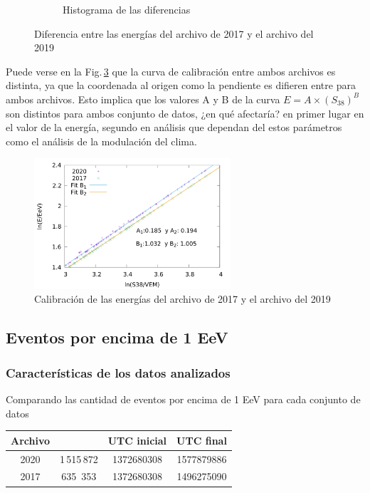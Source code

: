 \begin{figure}[H]
\begin{subfigure}[b]{0.5\textwidth}
							\caption{Histograma de las diferencias} 	\label{fig:histograma}
						\end{subfigure}
						\caption{Diferencia entre las energías del archivo de 2017 y el archivo del 2019}
					\end{figure}

			Puede verse en la Fig.\,\ref{fig:calibracionE} que la curva de calibración entre ambos archivos es distinta, ya que la coordenada al origen como la pendiente es difieren entre para ambos archivos. Esto implica que los valores A y B de la curva $E=A\times (S_{38})^B$ son distintos para ambos conjunto de datos, ¿en qué afectaría? en primer lugar en el valor de la energía, segundo en análisis que dependan del estos parámetros como el análisis de la modulación del clima.

				\begin{figure}[H]
					\centering
					\includegraphics[width=0.65\textwidth]{../Anisotropia/comparacion_reconstruccion.png}
					\caption{Calibración de las energías del archivo de 2017 y el archivo del 2019}
					\label{fig:calibracionE}
				\end{figure}

		\subsection{Eventos por encima de 1 EeV }
			\subsubsection{Características de los datos analizados}

			Comparando las cantidad de eventos por encima de 1 EeV para cada conjunto de datos

				\begin{table}[H]
					\centering
						\begin{tabular}{c|c|c|c}
						\textbf{Archivo} & \text{Eventos} 	& UTC inicial &  UTC final  \\ \hline
						2020			 & 1\,515\,872		& 1372680308  & 1577879886 \\
						2017			 & 635\, 353		& 1372680308  & 1496275090 \\
						\end{tabular}
				\end{table}

